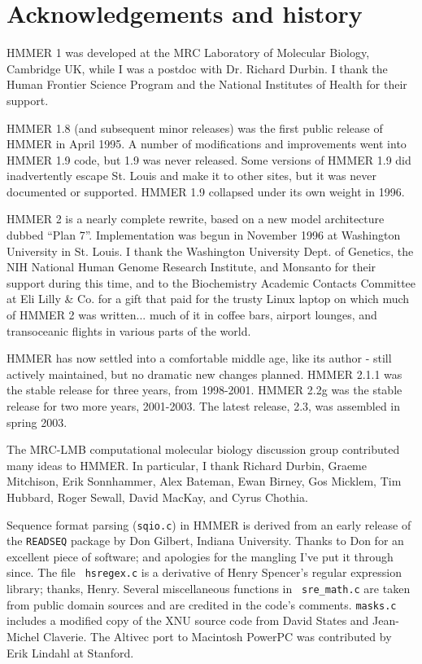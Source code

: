 \section{Acknowledgements and history}

HMMER 1 was developed at the MRC Laboratory of Molecular Biology,
Cambridge UK, while I was a postdoc with Dr. Richard Durbin. I thank
the Human Frontier Science Program and the National Institutes of
Health for their support. 

HMMER 1.8 (and subsequent minor releases) was the first public release
of HMMER in April 1995. A number of modifications and improvements
went into HMMER 1.9 code, but 1.9 was never released. Some versions of
HMMER 1.9 did inadvertently escape St. Louis and make it to other
sites, but it was never documented or supported. HMMER 1.9 collapsed
under its own weight in 1996.

HMMER 2 is a nearly complete rewrite, based on a new model
architecture dubbed ``Plan 7''. Implementation was begun in November
1996 at Washington University in St. Louis. I thank the Washington
University Dept. of Genetics, the NIH National Human Genome Research
Institute, and Monsanto for their support during this time, and to the
Biochemistry Academic Contacts Committee at Eli Lilly \& Co. for a
gift that paid for the trusty Linux laptop on which much of HMMER 2
was written... much of it in coffee bars, airport lounges, and
transoceanic flights in various parts of the world.

HMMER has now settled into a comfortable middle age, like its author -
still actively maintained, but no dramatic new changes planned.  HMMER
2.1.1 was the stable release for three years, from 1998-2001.  HMMER
2.2g was the stable release for two more years, 2001-2003. The latest
release, 2.3, was assembled in spring 2003.

The MRC-LMB computational molecular biology discussion group
contributed many ideas to HMMER. In particular, I thank Richard
Durbin, Graeme Mitchison, Erik Sonnhammer, Alex Bateman, Ewan Birney,
Gos Micklem, Tim Hubbard, Roger Sewall, David MacKay, and Cyrus
Chothia. 

Sequence format parsing ({\tt sqio.c}) in HMMER is derived from an
early release of the {\tt READSEQ} package by Don Gilbert, Indiana
University. Thanks to Don for an excellent piece of software; and
apologies for the mangling I've put it through since.  The file {\tt
hsregex.c} is a derivative of Henry Spencer's regular expression
library; thanks, Henry. Several miscellaneous functions in {\tt
sre\_math.c} are taken from public domain sources and are credited in
the code's comments. {\tt masks.c} includes a modified copy of the XNU
source code from David States and Jean-Michel Claverie. The Altivec
port to Macintosh PowerPC was contributed by Erik Lindahl at Stanford.

